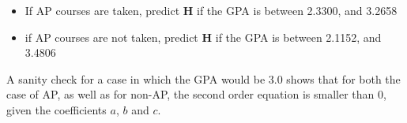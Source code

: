\documentclass{article}
\begin{document}
\begin{itemize}
\item If AP courses are taken, predict \textbf{H} if the GPA is between 2.3300, and 3.2658
\item if AP courses are not taken, predict \textbf{H} if the GPA is between 2.1152, and 3.4806
\end{itemize}

A sanity check for a case in which the GPA would be 3.0 shows that for both the case of AP, as well as for non-AP, the second order equation is smaller than 0, given the coefficients $a$, $b$ and $c$.
\end{document}
